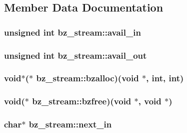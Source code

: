 \subsection{Member Data Documentation}
\hypertarget{structbz__stream_a3b4296261f93965fc477277c410603af}{
\subsubsection[{avail\-\_\-in}]{\setlength{\rightskip}{0pt plus 5cm}unsigned int bz\-\_\-stream\-::avail\-\_\-in}}\label{structbz__stream_a3b4296261f93965fc477277c410603af}
\hypertarget{structbz__stream_a749a8dd37243c6b76f81de5cd2a24e2e}{
\subsubsection[{avail\-\_\-out}]{\setlength{\rightskip}{0pt plus 5cm}unsigned int bz\-\_\-stream\-::avail\-\_\-out}}\label{structbz__stream_a749a8dd37243c6b76f81de5cd2a24e2e}
\hypertarget{structbz__stream_ac3032f7dc55a481047e436892ac5199d}{
\subsubsection[{bzalloc}]{\setlength{\rightskip}{0pt plus 5cm}void$\ast$($\ast$ bz\-\_\-stream\-::bzalloc)(void $\ast$, int, int)}}\label{structbz__stream_ac3032f7dc55a481047e436892ac5199d}
\hypertarget{structbz__stream_a71c2bc381f011bebd32462975c4b75cb}{
\subsubsection[{bzfree}]{\setlength{\rightskip}{0pt plus 5cm}void($\ast$ bz\-\_\-stream\-::bzfree)(void $\ast$, void $\ast$)}}\label{structbz__stream_a71c2bc381f011bebd32462975c4b75cb}
\hypertarget{structbz__stream_aa4a76b5c671cc4092ad7417f2731b894}{
\subsubsection[{next\-\_\-in}]{\setlength{\rightskip}{0pt plus 5cm}char$\ast$ bz\-\_\-stream\-::next\-\_\-in}}\label{structbz__stream_aa4a76b5c671cc4092ad7417f2731b894}
